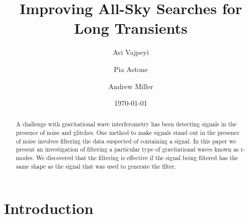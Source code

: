 \documentclass[%
reprint,
amsmath,amssymb,
aps,
]{revtex4-1}
\begin{document}
	
	
	\title{Improving All-Sky Searches for Long Transients}%
	
	
	
	\author{Avi Vajpeyi}
	
	\author{Pia Astone}
	
	\author{Andrew Miller}
	
	
	\date{\today}
	
	\begin{abstract}
		A challenge with gravitational wave interferometry has been detecting signals in the presence of noise and glitches. One method to make signals stand out in the presence of noise involves filtering the data suspected of containing a signal. In this paper we present an investigation of filtering a particular type of gravitational waves known as r-modes. We discovered that the filtering is effective if the signal being filtered has the same shape as the signal that was used to generate the filter. 
	\end{abstract}
	
	
	\maketitle
	
	
	
	\section{Introduction}
	
	
\end{document}
